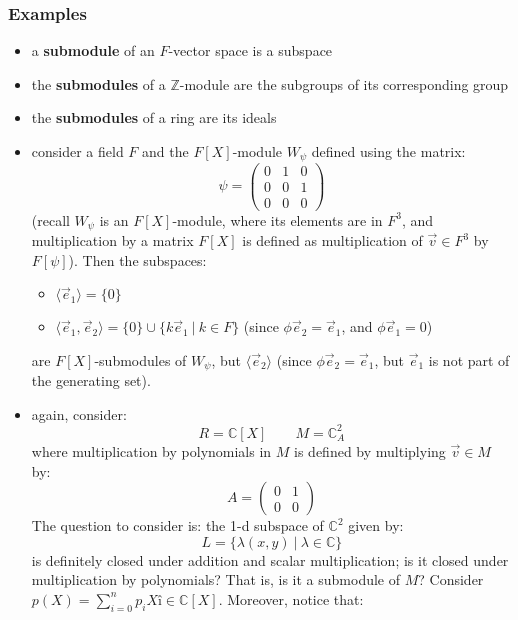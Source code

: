 \documentclass{exam}
\begin{document}
\subsubsection{Examples}

\begin{itemize}
    \item a \textbf{submodule} of an $F$-vector space is a subspace
    \item the \textbf{submodules} of a $\mathbb{Z}$-module are the subgroups of its corresponding group
    \item the \textbf{submodules} of a ring are its ideals
    \item consider a field $F$ and the $F[X]$-module $W_\psi$ defined using the matrix:
    \[
    \psi = \begin{pmatrix}
    0 & 1 & 0 \\
    0 & 0 & 1 \\
    0 & 0 & 0
    \end{pmatrix}
    \]
    (recall $W_\psi$ is an $F[X]$-module, where its elements are in $F^3$, and multiplication by a matrix $F[X]$ is defined as multiplication of $\vec{v} \in F^3$ by $F[\psi]$). Then the subspaces:
    \begin{itemize}
        \item $\langle \vec{e}_1 \rangle = \{0\}$
        \item $\langle \vec{e}_1, \vec{e}_2 \rangle = \{0\} \cup \{k\vec{e}_1 \ | \ k \in F\}$ (since $\phi \vec{e}_2 = \vec{e}_1$, and $\phi \vec{e}_1 = 0$)
    \end{itemize}
    are $F[X]$-submodules of $W_\psi$, but $\langle \vec{e}_2 \rangle$ (since $\phi \vec{e}_2 = \vec{e}_1$, but $\vec{e}_1$ is not part of the generating set).
    \item again, consider:
    \[
    R = \mathbb{C}[X] \qquad M = \mathbb{C}_A^2
    \]
    where multiplication by polynomials in $M$ is defined by multiplying $\vec{v} \in M$ by:
    \[
    A = \begin{pmatrix}
    0 & 1 \\
    0 & 0
    \end{pmatrix}
    \]
    The question to consider is: the 1-d subspace of $\mathbb{C}^2$ given by:
    \[
    L = \{\lambda (x,y) \ | \ \lambda \in \mathbb{C}\}
    \]
    is definitely closed under addition and scalar multiplication; is it closed under multiplication by polynomials? That is, is it a submodule of $M$?
    \bigskip
    Consider $p(X) = \sum_{i = 0}^n p_iXî \in \mathbb{C}[X]$. Moreover, notice that:

\end{itemize}
\end{document}
